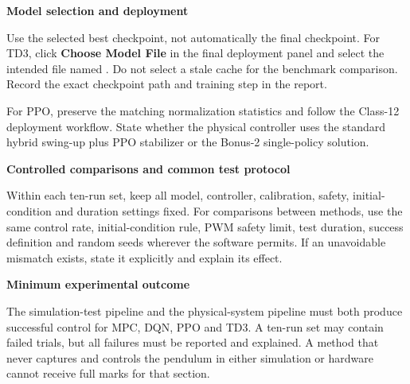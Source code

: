 \documentclass[11pt,a4paper]{article}
\newcommand{\code}[1]{\texttt{\detokenize{#1}}}
\begin{document}
\begin{warningbox}
\textbf{Model selection and deployment}

Use the selected best checkpoint, not automatically the final checkpoint.
For TD3, click \textbf{Choose Model File} in the final deployment panel and
select the intended file named \code{best_model.zip}. Do not select a stale
\code{*.td3_deploy.npz} cache for the benchmark comparison. Record the exact
checkpoint path and training step in the report.

For PPO, preserve the matching normalization statistics and follow the Class-12
deployment workflow. State whether the physical controller uses the standard
hybrid swing-up plus PPO stabilizer or the Bonus-2 single-policy solution.
\end{warningbox}

\begin{requirementbox}
\textbf{Controlled comparisons and common test protocol}

Within each ten-run set, keep all model, controller, calibration, safety,
initial-condition and duration settings fixed. For comparisons between methods,
use the same control rate, initial-condition rule, PWM safety limit, test
duration, success definition and random seeds wherever the software permits.
If an unavoidable mismatch exists, state it explicitly and explain its effect.
\end{requirementbox}

\begin{requirementbox}
\textbf{Minimum experimental outcome}

The simulation-test pipeline and the physical-system pipeline must both produce
successful control for MPC, DQN, PPO and TD3. A ten-run set may contain failed
trials, but all failures must be reported and explained. A method that never
captures and controls the pendulum in either simulation or hardware cannot
receive full marks for that section.
\end{requirementbox}
\end{document}
